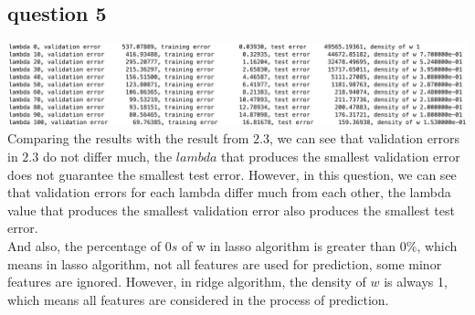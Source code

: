 \documentclass[11pt]{article} %
\begin{document}
\subsection{question 5}
\includegraphics[scale=0.45]{e2q5}\\
Comparing the results with the result from $2.3$, we can see that validation errors in $2.3$ do not differ much, the $lambda$ that produces the smallest validation error does not guarantee the smallest test error. However, in this question, we can see that validation errors for each lambda differ much from each other, the lambda value that produces the smallest validation error also produces the smallest test error. \\
And also, the percentage of $0s$ of w in lasso algorithm is greater than $0\%$, which means in lasso algorithm, not all features are used for prediction, some minor features are ignored. However, in ridge algorithm, the density of $w$ is always 1, which means all features are considered in the process of prediction. 
\end{document}
